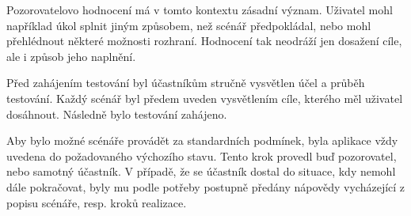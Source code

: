 Pozorovatelovo hodnocení má v tomto kontextu zásadní význam. 
Uživatel mohl například úkol splnit jiným způsobem, než scénář předpokládal, nebo mohl přehlédnout některé možnosti rozhraní. 
Hodnocení tak neodráží jen dosažení cíle, ale i způsob jeho naplnění.

Před zahájením testování byl účastníkům stručně vysvětlen účel a průběh testování. 
Každý scénář byl předem uveden vysvětlením cíle, kterého měl uživatel dosáhnout. 
Následně bylo testování zahájeno.

Aby bylo možné scénáře provádět za standardních podmínek, byla aplikace vždy uvedena do požadovaného výchozího stavu. 
Tento krok provedl buď pozorovatel, nebo samotný účastník. 
V případě, že se účastník dostal do situace, kdy nemohl dále pokračovat, byly mu podle potřeby postupně předány nápovědy vycházející z popisu scénáře, resp. kroků realizace.









